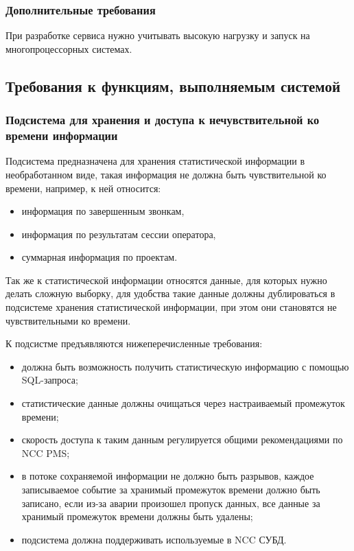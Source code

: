 \subsubsection{Дополнительные требования}

При разработке сервиса нужно учитывать высокую нагрузку и запуск на многопроцессорных системах.

\subsection{Требования к функциям, выполняемым системой}

\subsubsection{Подсистема для хранения и доступа к нечувствительной ко времени информации}

Подсистема предназначена для хранения статистической информации в необработанном виде,
такая информация не должна быть чувствительной ко времени,
например, к ней относится:
\begin{itemize}
    \item информация по завершенным звонкам,
    \item информация по результатам сессии оператора,
    \item суммарная информация по проектам.
\end{itemize}
Так же к статистической информации относятся данные, для которых нужно делать сложную выборку,
для удобства такие данные должны дублироваться в подсистеме хранения статистической информации,
при этом они становятся не чувствительными ко времени.

К подсистме предъявляются нижеперечисленные требования:
\begin{itemize}
    \item должна быть возможность получить статистическую информацию с помощью SQL-запроса;
    \item статистические данные должны очищаться через настраиваемый промежуток времени;
    \item скорость доступа к таким данным регулируется общими рекомендациями по NCC PMS;
    \item в потоке сохраняемой информации не должно быть разрывов,
    каждое записываемое событие за хранимый промежуток времени должно быть записано,
    если из-за аварии произошел пропуск данных,
    все данные за хранимый промежуток времени должны быть удалены;
    \item подсистема должна поддерживать используемые в NCC СУБД\@.
\end{itemize}

